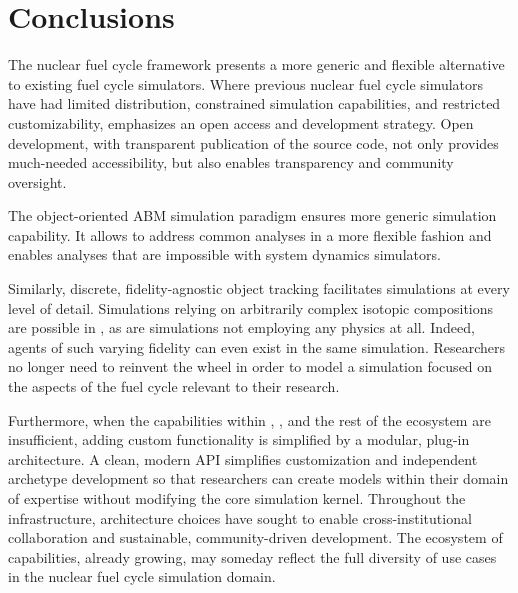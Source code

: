 

\section{Conclusions}


The \Cyclus nuclear fuel cycle framework presents a more generic and flexible
alternative to existing fuel cycle simulators. Where previous nuclear fuel cycle simulators have had limited distribution,
constrained simulation capabilities, and restricted customizability, \Cyclus emphasizes an
open access and development strategy.  Open development, with transparent
publication of the source code, not only provides much-needed accessibility,
but also enables transparency and community oversight.

The object-oriented \gls{ABM} simulation paradigm ensures more generic
simulation capability. It allows \Cyclus to address common analyses in a more
flexible fashion and enables analyses that are impossible with system dynamics
simulators.

Similarly, discrete, fidelity-agnostic object tracking facilitates simulations
at every level of detail. Simulations relying on arbitrarily complex isotopic
compositions are possible in \Cyclus, as are simulations not employing any
physics at all. Indeed, agents of such varying fidelity can even exist in the
same simulation. Researchers no longer need to reinvent the wheel in order to
model a simulation focused on the aspects of the fuel cycle
relevant to their research.

Furthermore, when the capabilities within \Cyclus, \Cycamore, and the rest of
the ecosystem are insufficient, adding custom functionality is simplified by a
modular, plug-in architecture. A clean, modern \gls{API} simplifies
customization and independent archetype development so that researchers can
create models within their domain of expertise without modifying the core
simulation kernel. Throughout the \Cyclus
infrastructure, architecture choices have sought to enable cross-institutional
collaboration and sustainable, community-driven development. The ecosystem
of capabilities, already growing, may someday reflect the full diversity of use
cases in the nuclear fuel cycle simulation domain.


